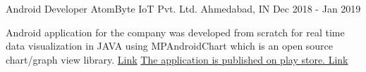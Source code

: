 \begin{cventries}
  \cventry
     {Android Developer} %
    {AtomByte IoT Pvt. Ltd.} %
    {Ahmedabad, IN} %
    {Dec 2018 - Jan 2019} %
    {
      \begin{cvitems} %
        \item {Android application for the company was developed from scratch for real time data visualization in JAVA using MPAndroidChart which is an open source chart/graph view library. \href{https://drive.google.com/open?id=1Wf_X23r4PNkoN9Pf-WYacyoW3gCFnh-O}{Link} \href{https://play.google.com/store/apps/details?id=app.ruchitesh.atombyteapp&hl=en}{ The application is published on play store. Link}
        }
      \end{cvitems}
    }




\end{cventries}
